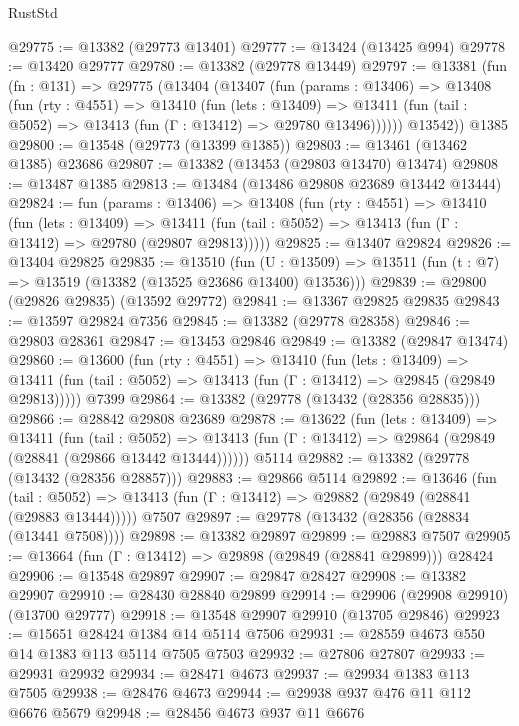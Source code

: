 \begin{lexlean}{RustStd}
\begin{coremodule}
@29775 := @13382 (@29773 @13401)
@29777 := @13424 (@13425 @994)
@29778 := @13420 @29777
@29780 := @13382 (@29778 @13449)
@29797 := @13381
    (fun (fn : @131) =>
    @29775
      (@13404
        (@13407
          (fun (params : @13406) =>
          @13408
            (fun (rty : @4551) =>
            @13410
              (fun (lets : @13409) =>
              @13411 (fun (tail : @5052) => @13413 (fun (Γ : @13412) => @29780 @13496))))))
        @13542))
    @1385
@29800 := @13548 (@29773 (@13399 @1385))
@29803 := @13461 (@13462 @1385) @23686
@29807 := @13382 (@13453 (@29803 @13470) @13474)
@29808 := @13487 @1385
@29813 := @13484 (@13486 @29808 @23689 @13442 @13444)
@29824 := fun (params : @13406) =>
  @13408
    (fun (rty : @4551) =>
    @13410
      (fun (lets : @13409) =>
      @13411 (fun (tail : @5052) => @13413 (fun (Γ : @13412) => @29780 (@29807 @29813)))))
@29825 := @13407 @29824
@29826 := @13404 @29825
@29835 := @13510
    (fun (U : @13509) => @13511 (fun (t : @7) => @13519 (@13382 (@13525 @23686 @13400) @13536)))
@29839 := @29800 (@29826 @29835) (@13592 @29772)
@29841 := @13367 @29825 @29835
@29843 := @13597 @29824 @7356
@29845 := @13382 (@29778 @28358)
@29846 := @29803 @28361
@29847 := @13453 @29846
@29849 := @13382 (@29847 @13474)
@29860 := @13600
    (fun (rty : @4551) =>
    @13410
      (fun (lets : @13409) =>
      @13411 (fun (tail : @5052) => @13413 (fun (Γ : @13412) => @29845 (@29849 @29813)))))
    @7399
@29864 := @13382 (@29778 (@13432 (@28356 @28835)))
@29866 := @28842 @29808 @23689
@29878 := @13622
    (fun (lets : @13409) =>
    @13411
      (fun (tail : @5052) =>
      @13413 (fun (Γ : @13412) => @29864 (@29849 (@28841 (@29866 @13442 @13444))))))
    @5114
@29882 := @13382 (@29778 (@13432 (@28356 @28857)))
@29883 := @29866 @5114
@29892 := @13646
    (fun (tail : @5052) => @13413 (fun (Γ : @13412) => @29882 (@29849 (@28841 (@29883 @13444)))))
    @7507
@29897 := @29778 (@13432 (@28356 (@28834 (@13441 @7508))))
@29898 := @13382 @29897
@29899 := @29883 @7507
@29905 := @13664 (fun (Γ : @13412) => @29898 (@29849 (@28841 @29899))) @28424
@29906 := @13548 @29897
@29907 := @29847 @28427
@29908 := @13382 @29907
@29910 := @28430 @28840 @29899
@29914 := @29906 (@29908 @29910) (@13700 @29777)
@29918 := @13548 @29907 @29910 (@13705 @29846)
@29923 := @15651 @28424 @1384 @14 @5114 @7506
@29931 := @28559 @4673 @550 @14 @1383 @113 @5114 @7505 @7503
@29932 := @27806 @27807
@29933 := @29931 @29932
@29934 := @28471 @4673
@29937 := @29934 @1383 @113 @7505
@29938 := @28476 @4673
@29944 := @29938 @937 @476 @11 @112 @6676 @5679
@29948 := @28456 @4673 @937 @11 @6676

\end{coremodule}
\end{lexlean}
